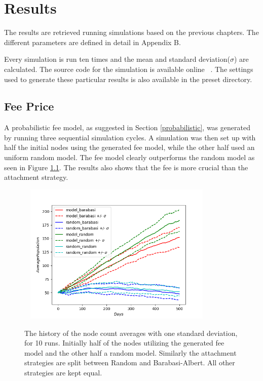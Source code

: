 \chapter{Results}

The results are retrieved running simulations based on the previous chapters. The different parameters are defined in detail in Appendix B.

Every simulation is run ten times and the mean and standard deviation($\sigma$) are calculated. The source code for the simulation is available online~\cite{repository:me:thesis} . The settings used to generate these particular results is also available in the preset directory. 


\section{Fee Price}

A probabilistic fee model, as suggested in Section \ref{probabilistic}, was generated by running three sequential simulation cycles. A simulation was then set up with half the initial nodes using the generated fee model, while the other half used an uniform random model. The fee model clearly outperforms the random model as seen in Figure \ref{fig:history_price}. The results also shows that the fee is more crucial than the attachment strategy. 

\begin{figure}[!htb]

	\hspace*{-0.5cm}\ 
	\centering
	\includegraphics[width=9cm]{images/histories_deviation_price.png}
	\caption{ The history of the node count averages with one standard deviation, for 10 runs. Initially half of the nodes utilizing the generated fee model and the other half a random model. Similarly the attachment strategies are split between Random and Barabasi-Albert. All other strategies are kept equal.
	}
	\label{fig:history_price}
	\hspace*{2mm} 
\end{figure}

